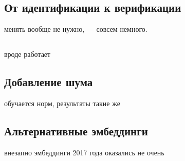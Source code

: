 \subsection{От идентификации к верификации}
\enquirer{} менять вообще не нужно, \guesser{} --- совсем немного.

\subsection{\cbenquirer}
вроде работает

\subsection{Добавление шума}
обучается норм, результаты такие же

\subsection{Альтернативные эмбеддинги}\label{ssec:cpc}
внезапно эмбеддинги 2017 года оказались не очень
